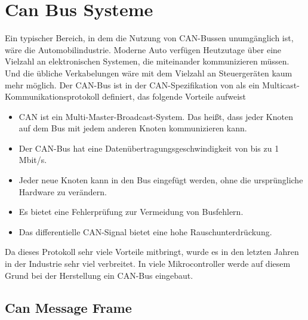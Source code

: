 \section{Can Bus Systeme}
\label{sec:Can_Bus_Controller}

Ein typischer Bereich, in dem die Nutzung von CAN-Bussen unumgänglich ist, wäre die Automobilindustrie. Moderne Auto verfügen Heutzutage über eine Vielzahl an elektronischen Systemen, die miteinander kommunizieren müssen. Und die übliche Verkabelungen wäre mit dem Vielzahl an Steuergeräten kaum mehr möglich. Der CAN-Bus ist in der CAN-Spezifikation von  \cite{Bosch1991} als ein Multicast-Kommunikationsprotokoll definiert, das folgende Vorteile aufweist
\begin{itemize}
	\item CAN ist ein Multi-Master-Broadcast-System. Das heißt, dass jeder Knoten auf dem Bus mit jedem anderen Knoten kommunizieren kann.
	\item Der CAN-Bus hat eine Datenübertragungsgeschwindigkeit von bis zu 1 Mbit/s.
	\item Jeder neue Knoten kann in den Bus eingefügt werden, ohne die ursprüngliche Hardware zu verändern.
	\item Es bietet eine Fehlerprüfung zur Vermeidung von Busfehlern.
	 \item Das differentielle CAN-Signal bietet eine hohe Rauschunterdrückung.
\end{itemize}

Da dieses Protokoll sehr viele Vorteile mitbringt, wurde es in den letzten Jahren in der Industrie sehr viel verbreitet. In viele Mikrocontroller werde auf diesem Grund bei der Herstellung ein CAN-Bus eingebaut.  


\subsection{Can Message Frame}
\label{subsec:can_bus_controller:can_frame}

